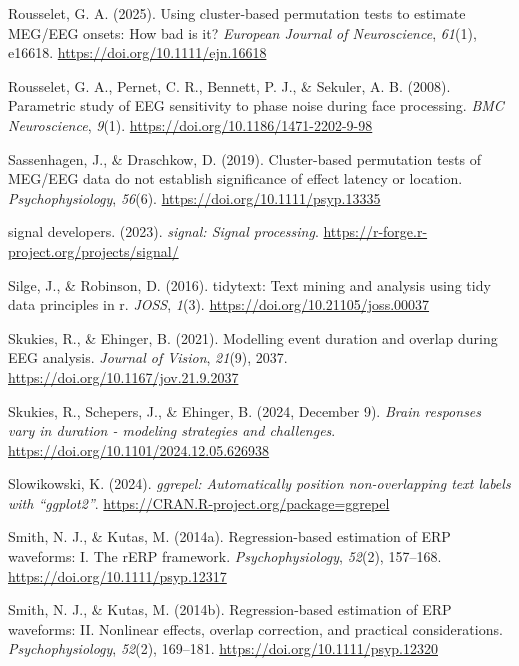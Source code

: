 \documentclass[
  doc,
  floatsintext,
  longtable,
  a4paper,
  nolmodern,
  notxfonts,
  notimes,
  colorlinks=true,linkcolor=blue,citecolor=blue,urlcolor=blue]{apa7}
\newlength{\cslhangindent}
\newenvironment{CSLReferences}[2] %
 {\begin{list}{}{%
  \setlength{\itemindent}{0pt}
  \setlength{\leftmargin}{0pt}
  \setlength{\parsep}{0pt}
  \ifodd #1
   \setlength{\leftmargin}{\cslhangindent}
   \setlength{\itemindent}{-1\cslhangindent}
  \fi
  \setlength{\itemsep}{#2\baselineskip}}}
 {\end{list}}
\begin{document}
\begin{CSLReferences}{1}{0}
Rousselet, G. A. (2025). Using cluster-based permutation tests to
estimate {MEG}/{EEG} onsets: {How} bad is it? \emph{European Journal of
Neuroscience}, \emph{61}(1), e16618.
\url{https://doi.org/10.1111/ejn.16618}

Rousselet, G. A., Pernet, C. R., Bennett, P. J., \& Sekuler, A. B.
(2008). Parametric study of EEG sensitivity to phase noise during face
processing. \emph{BMC Neuroscience}, \emph{9}(1).
\url{https://doi.org/10.1186/1471-2202-9-98}

Sassenhagen, J., \& Draschkow, D. (2019). Cluster{-}based permutation
tests of MEG/EEG data do not establish significance of effect latency or
location. \emph{Psychophysiology}, \emph{56}(6).
\url{https://doi.org/10.1111/psyp.13335}

signal developers. (2023). \emph{{signal}: Signal processing}.
\url{https://r-forge.r-project.org/projects/signal/}

Silge, J., \& Robinson, D. (2016). {tidytext}: Text mining and analysis
using tidy data principles in r. \emph{JOSS}, \emph{1}(3).
\url{https://doi.org/10.21105/joss.00037}

Skukies, R., \& Ehinger, B. (2021). Modelling event duration and overlap
during {EEG} analysis. \emph{Journal of Vision}, \emph{21}(9), 2037.
\url{https://doi.org/10.1167/jov.21.9.2037}

Skukies, R., Schepers, J., \& Ehinger, B. (2024, December 9).
\emph{Brain responses vary in duration - modeling strategies and
challenges}. \url{https://doi.org/10.1101/2024.12.05.626938}

Slowikowski, K. (2024). \emph{{ggrepel}: Automatically position
non-overlapping text labels with {``{ggplot2}''}}.
\url{https://CRAN.R-project.org/package=ggrepel}

Smith, N. J., \& Kutas, M. (2014a). Regression{-}based estimation of ERP
waveforms: I. The rERP framework. \emph{Psychophysiology}, \emph{52}(2),
157--168. \url{https://doi.org/10.1111/psyp.12317}

Smith, N. J., \& Kutas, M. (2014b). Regression{-}based estimation of ERP
waveforms: II. Nonlinear effects, overlap correction, and practical
considerations. \emph{Psychophysiology}, \emph{52}(2), 169--181.
\url{https://doi.org/10.1111/psyp.12320}


\end{CSLReferences}
\end{document}
